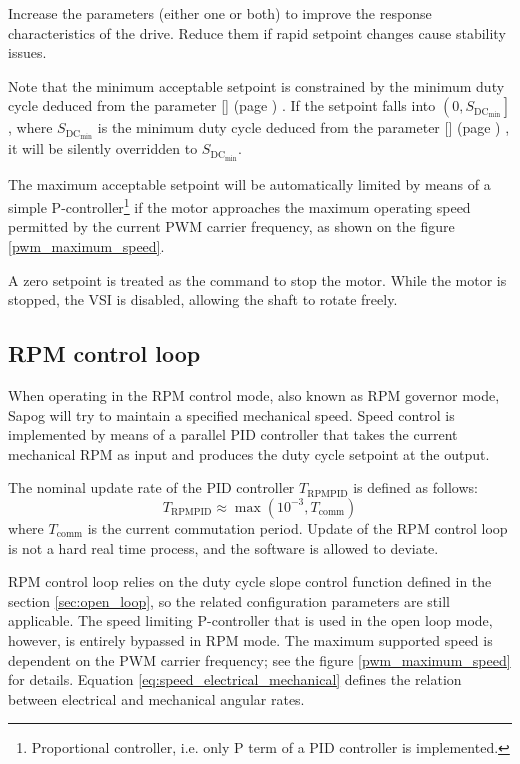 \documentclass{zubaxdoc}
\newcommand{\CfgRef}[1]{
    \StrSubstitute{#1}{+}{\textunderscore}[\temp]
    \texttt{\temp} {\footnotesize (page \pageref{#1})}
}
\begin{document}
Increase the parameters (either one or both) to improve the response characteristics of the drive.
Reduce them if rapid setpoint changes cause stability issues.

Note that the minimum acceptable setpoint is constrained by the minimum duty cycle deduced from
the parameter \CfgRef{mot+v+min}.
If the setpoint falls into $\left(0, S_{\text{DC}_\text{min}}\right]$,
where $S_{\text{DC}_\text{min}}$ is the minimum
duty cycle deduced from the parameter \CfgRef{mot+v+min},
it will be silently overridden to $S_{\text{DC}_\text{min}}$.

The maximum acceptable setpoint will be automatically limited by means of a simple
P-controller\footnote{Proportional controller, i.e. only P term of a PID controller is implemented.}
if the motor approaches the maximum operating speed permitted by the
current PWM carrier frequency, as shown on the figure \ref{pwm_maximum_speed}.

A zero setpoint is treated as the command to stop the motor.
While the motor is stopped, the VSI is disabled, allowing the shaft to rotate freely.

\subsection{RPM control loop}

When operating in the RPM control mode, also known as RPM governor mode,
Sapog will try to maintain a specified mechanical speed.
Speed control is implemented by means of a parallel PID controller
that takes the current mechanical RPM as input and
produces the duty cycle setpoint at the output.

The nominal update rate of the PID controller $T_{\text{RPMPID}}$ is defined as follows:
\begin{equation}\label{eq:rpm_pid_control_loop_period}
T_{\text{RPMPID}} \approx \max \left(10^{-3},T_{\text{comm}}\right)
\end{equation}
where $T_\text{comm}$ is the current commutation period.
Update of the RPM control loop is not a hard real time process, and the software is allowed to
deviate.

RPM control loop relies on the duty cycle slope control function defined in the section \ref{sec:open_loop},
so the related configuration parameters are still applicable.
The speed limiting P-controller that is used in the open loop mode, however,
is entirely bypassed in RPM mode.
The maximum supported speed is dependent on the PWM carrier frequency;
see the figure \ref{pwm_maximum_speed} for details.
Equation \ref{eq:speed_electrical_mechanical} defines the relation between electrical
and mechanical angular rates.
\end{document}
